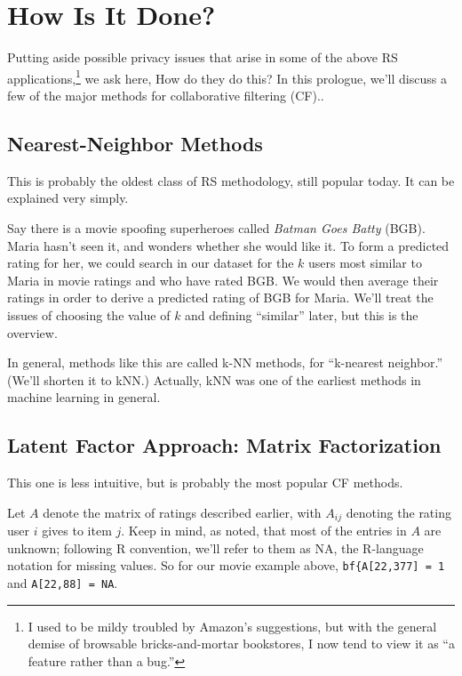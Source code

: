 \section{How Is It Done?}

Putting aside possible privacy issues that arise in some of the above RS
applications,\footnote{I used to be mildy
troubled by Amazon's suggestions, but with the general demise of
browsable bricks-and-mortar bookstores, I now tend to view it as ``a
feature rather than a bug.''} we ask here, How do they do this?  In this
prologue, we'll discuss a few of the major methods for collaborative
filtering (CF)..

\subsection{Nearest-Neighbor Methods}

This is probably the oldest class of RS methodology, still popular
today.  It can be explained very simply.

Say there is a movie spoofing superheroes called \textit{Batman Goes
Batty} (BGB).  Maria hasn't seen it, and wonders whether she would like
it.  To form a predicted rating for her, we could search in our dataset
for the $k$ users most similar to Maria in movie ratings and who have
rated BGB.  We would then average their ratings in order to derive a
predicted rating of BGB for Maria.  We'll treat the issues of choosing
the value of $k$ and defining ``similar'' later, but this is the
overview.

In general, methods like this are called k-NN methods,
for ``k-nearest neighbor.''  (We'll shorten it to kNN.)
Actually, kNN was one of the earliest methods in machine learning in
general.

\subsection{Latent Factor Approach:  Matrix Factorization}
\label{mf}

This one is less intuitive, but is probably the most popular CF methods.

Let $A$ denote the matrix of ratings described earlier, with $A_{ij}$
denoting the rating user $i$ gives to item $j$.  Keep in mind, as noted,
that most of the entries in $A$ are unknown; following R convention,
we'll refer to them as NA, the R-language notation for missing values.  
So for our movie example above, \lstinline{bf{A[22,377] = 1} and
\lstinline{A[22,88] = NA}.

